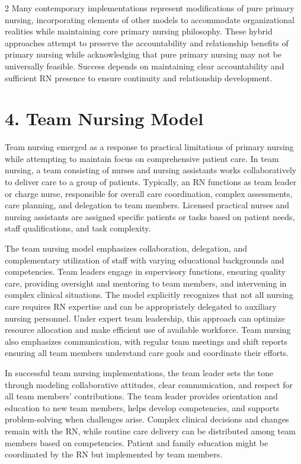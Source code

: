 \documentclass[12pt]{article}
\begin{document}
\begin{multicols}{2}
Many contemporary implementations represent modifications of pure primary nursing, incorporating elements of other models to accommodate organizational realities while maintaining core primary nursing philosophy. These hybrid approaches attempt to preserve the accountability and relationship benefits of primary nursing while acknowledging that pure primary nursing may not be universally feasible. Success depends on maintaining clear accountability and sufficient RN presence to ensure continuity and relationship development.

\section*{4. \quad Team Nursing Model}

Team nursing emerged as a response to practical limitations of primary nursing while attempting to maintain focus on comprehensive patient care. In team nursing, a team consisting of nurses and nursing assistants works collaboratively to deliver care to a group of patients. Typically, an RN functions as team leader or charge nurse, responsible for overall care coordination, complex assessments, care planning, and delegation to team members. Licensed practical nurses and nursing assistants are assigned specific patients or tasks based on patient needs, staff qualifications, and task complexity.

The team nursing model emphasizes collaboration, delegation, and complementary utilization of staff with varying educational backgrounds and competencies. Team leaders engage in supervisory functions, ensuring quality care, providing oversight and mentoring to team members, and intervening in complex clinical situations. The model explicitly recognizes that not all nursing care requires RN expertise and can be appropriately delegated to auxiliary nursing personnel. Under expert team leadership, this approach can optimize resource allocation and make efficient use of available workforce. Team nursing also emphasizes communication, with regular team meetings and shift reports ensuring all team members understand care goals and coordinate their efforts.

In successful team nursing implementations, the team leader sets the tone through modeling collaborative attitudes, clear communication, and respect for all team members' contributions. The team leader provides orientation and education to new team members, helps develop competencies, and supports problem-solving when challenges arise. Complex clinical decisions and changes remain with the RN, while routine care delivery can be distributed among team members based on competencies. Patient and family education might be coordinated by the RN but implemented by team members.


\end{multicols}
\end{document}
